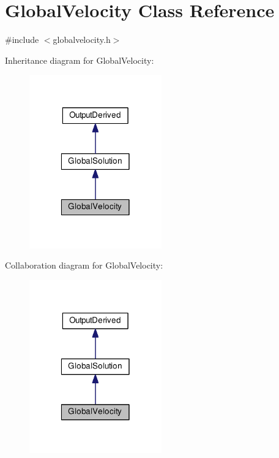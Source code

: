 \hypertarget{class_global_velocity}{\section{Global\-Velocity Class Reference}
\label{class_global_velocity}
}


{\ttfamily \#include $<$globalvelocity.\-h$>$}



Inheritance diagram for Global\-Velocity\-:\nopagebreak
\begin{figure}[H]
\begin{center}
\leavevmode
\includegraphics[width=162pt]{class_global_velocity__inherit__graph}
\end{center}
\end{figure}


Collaboration diagram for Global\-Velocity\-:\nopagebreak
\begin{figure}[H]
\begin{center}
\leavevmode
\includegraphics[width=162pt]{class_global_velocity__coll__graph}
\end{center}
\end{figure}
